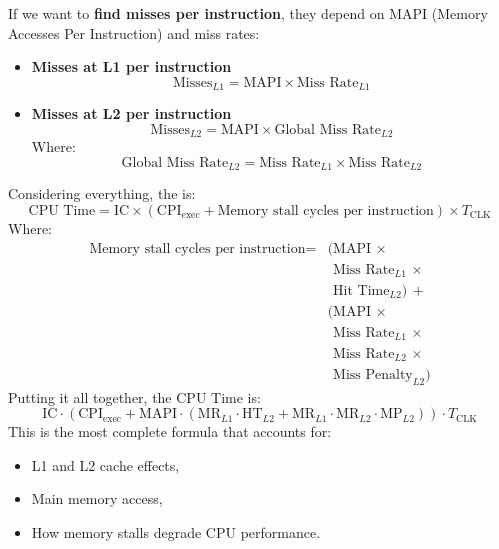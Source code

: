 If we want to \textbf{find misses per instruction}, they depend on MAPI (Memory Accesses Per Instruction) and miss rates:
\begin{itemize}
    \item \textbf{Misses at L1 per instruction}
    \begin{equation*}
        \text{Misses}_{L1} = \text{MAPI} \times \text{Miss Rate}_{L1}
    \end{equation*}
    \item \textbf{Misses at L2 per instruction}
    \begin{equation*}
        \text{Misses}_{L2} = \text{MAPI} \times \text{Global Miss Rate}_{L2}
    \end{equation*}
    Where:
    \begin{equation*}
        \text{Global Miss Rate}_{L2} = \text{Miss Rate}_{L1} \times \text{Miss Rate}_{L2}
    \end{equation*}
\end{itemize}
Considering everything, the  is:
\begin{equation}
    \text{CPU Time} = \text{IC} \times (\text{CPI}_{\text{exec}} + \text{Memory stall cycles per instruction}) \times T_{\text{CLK}}    
\end{equation}
Where:
\begin{equation}
    \begin{array}{rl}
        \text{Memory stall cycles per instruction} =& (\text{MAPI}\, \times \\ [.3em]
        & \phantom{(} \text{Miss Rate}_{L1}\, \times \\ [.3em]
        & \phantom{(} \text{Hit Time}_{L2})\, + \\ [.3em]
        & (\text{MAPI}\, \times \\
        & \phantom{(} \text{Miss Rate}_{L1}\, \times \\
        & \phantom{(} \text{Miss Rate}_{L2}\, \times \\
        & \phantom{(} \text{Miss Penalty}_{L2})
    \end{array}
\end{equation}
Putting it all together, the CPU Time is:
\begin{equation}
    \text{IC} \cdot \left( \text{CPI}_{\text{exec}} + \text{MAPI} \cdot (\text{MR}_{L1} \cdot \text{HT}_{L2} + \text{MR}_{L1} \cdot \text{MR}_{L2} \cdot \text{MP}_{L2}) \right) \cdot T_{\text{CLK}}
\end{equation}
This is the most complete formula that accounts for:
\begin{itemize}
    \item L1 and L2 cache effects,
    \item Main memory access,
    \item How memory stalls degrade CPU performance.
\end{itemize}
